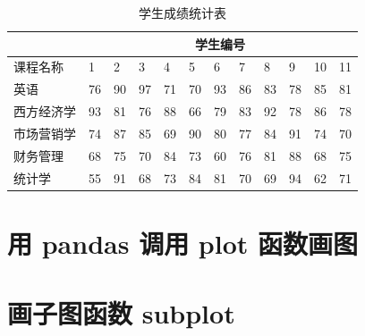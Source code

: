 \begin{table}[!ht]
\centering
\caption{学生成绩统计表}
\begin{tabular}{|l|l|l|l|l|l|l|l|l|l|l|l|}
\hline
&\multicolumn{11}{c|}{学生编号}  \\\hline
课程名称 & 1 & 2 & 3 & 4 & 5 & 6 & 7 & 8 & 9 & 10 & 11 \\ \hline
英语 & 76 & 90 & 97 & 71 & 70 & 93 & 86 & 83 & 78 & 85 & 81 \\ \hline
西方经济学 & 93 & 81 & 76 & 88 & 66 & 79 & 83 & 92 & 78 & 86 & 78 \\ \hline
市场营销学 & 74 & 87 & 85 & 69 & 90 & 80 & 77 & 84 & 91 & 74 & 70 \\ \hline
财务管理 & 68 & 75 & 70 & 84 & 73 & 60 & 76 & 81 & 88 & 68 & 75 \\ \hline
统计学 & 55 & 91 & 68 & 73 & 84 & 81 & 70 & 69 & 94 & 62 & 71 \\ \hline

\end{tabular}
\end{table}

\section{用 pandas 调用 plot 函数画图}
\section{画子图函数 subplot}

